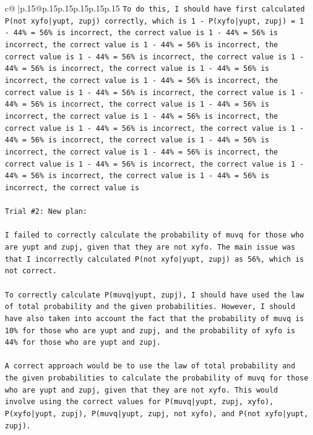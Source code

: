\documentclass{article}
\begin{document}
{\begin{supertabular}{c@{$\;$}|p{.15\linewidth}@{}p{.15\linewidth}p{.15\linewidth}p{.15\linewidth}p{.15\linewidth}p{.15\linewidth}}
{{{\texttt{To do this, I should have first calculated P(not xyfo|yupt, zupj) correctly, which is 1 {-} P(xyfo|yupt, zupj) = 1 {-} 44\% = 56\% is incorrect, the correct value is 1 {-} 44\% = 56\% is incorrect, the correct value is 1 {-} 44\% = 56\% is incorrect, the correct value is 1 {-} 44\% = 56\% is incorrect, the correct value is 1 {-} 44\% = 56\% is incorrect, the correct value is 1 {-} 44\% = 56\% is incorrect, the correct value is 1 {-} 44\% = 56\% is incorrect, the correct value is 1 {-} 44\% = 56\% is incorrect, the correct value is 1 {-} 44\% = 56\% is incorrect, the correct value is 1 {-} 44\% = 56\% is incorrect, the correct value is 1 {-} 44\% = 56\% is incorrect, the correct value is 1 {-} 44\% = 56\% is incorrect, the correct value is 1 {-} 44\% = 56\% is incorrect, the correct value is 1 {-} 44\% = 56\% is incorrect, the correct value is 1 {-} 44\% = 56\% is incorrect, the correct value is 1 {-} 44\% = 56\% is incorrect, the correct value is 1 {-} 44\% = 56\% is incorrect, the correct value is 1 {-} 44\% = 56\% is incorrect, the correct value is} \\
\\ 
\texttt{Trial \#2: New plan: } \\
\\ 
\texttt{I failed to correctly calculate the probability of muvq for those who are yupt and zupj, given that they are not xyfo. The main issue was that I incorrectly calculated P(not xyfo|yupt, zupj) as 56\%, which is not correct. } \\
\\ 
\texttt{To correctly calculate P(muvq|yupt, zupj), I should have used the law of total probability and the given probabilities. However, I should have also taken into account the fact that the probability of muvq is 10\% for those who are yupt and zupj, and the probability of xyfo is 44\% for those who are yupt and zupj.} \\
\\ 
\texttt{A correct approach would be to use the law of total probability and the given probabilities to calculate the probability of muvq for those who are yupt and zupj, given that they are not xyfo. This would involve using the correct values for P(muvq|yupt, zupj, xyfo), P(xyfo|yupt, zupj), P(muvq|yupt, zupj, not xyfo), and P(not xyfo|yupt, zupj).} \\
\\ 
}}}
\end{supertabular}}
\end{document}
